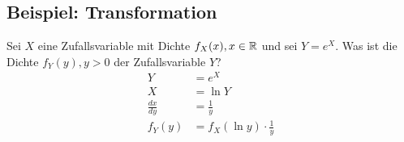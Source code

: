 \subsection*{Beispiel: Transformation}
Sei $X$ eine Zufallsvariable mit Dichte $f_X(x), x \in \mathbb{R}$ und sei $Y = e^X$. Was ist die Dichte $f_Y(y), y > 0$ der Zufallsvariable $Y$?
\begin{align*}
  Y             & = e^X                          \\
  X             & = \ln Y                        \\
  \frac{dx}{dy} & = \frac{1}{y}                  \\
  f_Y(y)        & = f_X(\ln y) \cdot \frac{1}{y} \\
\end{align*}
\BoxEnd{}
